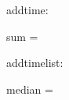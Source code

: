 \documentclass{scrlttr2}
\begin{document}
    addtime:
    
    
    
    sum = 
    
    
    
    \bigskip
    addtimelist:
    
    
    
    \timelistmedian
    
    median = 
    
\end{document}
